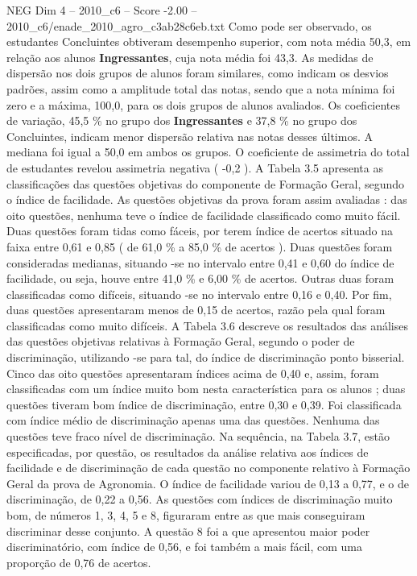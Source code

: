 \begin{textsample}{NEG Dim 4 – 2010\_c6 – Score -2.00 – 2010\_c6/enade\_2010\_agro\_c3ab28c6eb.txt}
Como pode ser observado, os estudantes Concluintes obtiveram desempenho superior, com nota média 50,3, em relação aos alunos \textbf{Ingressantes}, cuja nota média foi 43,3.
As medidas de dispersão nos dois grupos de alunos foram similares, como indicam os desvios padrões, assim como a amplitude total das notas, sendo que a nota mínima foi zero e a máxima, 100,0, para os dois grupos de alunos avaliados.
Os coeficientes de variação, 45,5 \% no grupo dos \textbf{Ingressantes} e 37,8 \% no grupo dos Concluintes, indicam menor dispersão relativa nas notas desses últimos.
A mediana foi igual a 50,0 em ambos os grupos.
O coeficiente de assimetria do total de estudantes revelou assimetria negativa ( -0,2 ).
A Tabela 3.5 apresenta as classificações das questões objetivas do componente de Formação Geral, segundo o índice de facilidade.
As questões objetivas da prova foram assim avaliadas : das oito questões, nenhuma teve o índice de facilidade classificado como muito fácil.
Duas questões foram tidas como fáceis, por terem índice de acertos situado na faixa entre 0,61 e 0,85 ( de 61,0 \% a 85,0 \% de acertos ).
Duas questões foram consideradas medianas, situando -se no intervalo entre 0,41 e 0,60 do índice de facilidade, ou seja, houve entre 41,0 \% e 6,00 \% de acertos.
Outras duas foram classificadas como difíceis, situando -se no intervalo entre 0,16 e 0,40.
Por fim, duas questões apresentaram menos de 0,15 de acertos, razão pela qual foram classificadas como muito difíceis.
A Tabela 3.6 descreve os resultados das análises das questões objetivas relativas à Formação Geral, segundo o poder de discriminação, utilizando -se para tal, do índice de discriminação ponto bisserial.
Cinco das oito questões apresentaram índices acima de 0,40 e, assim, foram classificadas com um índice muito bom nesta característica para os alunos ; duas questões tiveram bom índice de discriminação, entre 0,30 e 0,39.
Foi classificada com índice médio de discriminação apenas uma das questões.
Nenhuma das questões teve fraco nível de discriminação.
Na sequência, na Tabela 3.7, estão especificadas, por questão, os resultados da análise relativa aos índices de facilidade e de discriminação de cada questão no componente relativo à Formação Geral da prova de Agronomia.
O índice de facilidade variou de 0,13 a 0,77, e o de discriminação, de 0,22 a 0,56.
As questões com índices de discriminação muito bom, de números 1, 3, 4, 5 e 8, figuraram entre as que mais conseguiram discriminar desse conjunto.
A questão 8 foi a que apresentou maior poder discriminatório, com índice de 0,56, e foi também a mais fácil, com uma proporção de 0,76 de acertos.

\end{textsample}
